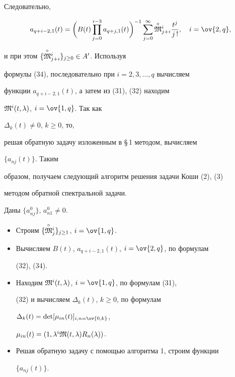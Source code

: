 Следовательно, 


\begin{equation} 


a_{q+i-2,1}(t)=\bigg(B(t)\prod^{i-3}_{j=0}a_{q+j,1}(t) 


\bigg)^{-1}\sum^\infty_{j=0}\up{\circ}{\frak M}^i_{j+i} 


\frac{t^j}{j\,!},\quad i=\ov{2,q}, 


\end{equation} 


и при этом $\{\overset{\circ}{\frak M}{}^i_{j+i}\}_{j\ge 0}\in A'$. Используя 


формулы (34), последовательно при $i=2,3,\dotsc,q$ вычисляем 


функции $a_{q+i-2,1}(t)$, а затем из (31), (32) находим 


$\frak M^i(t,\lambda)$, $i=\ov{1,q}$. Так как 


$\Delta_k(t)\ne 0$, $k\ge 0$, то, 


решая обратную задачу изложенным в \S\,1 методом, вычисляем 


$\{a_{nj}(t)\}$. Таким 


образом, получаем следующий алгоритм решения задачи Коши (2), (3) 


методом обратной спектральной задачи. 


 


\begin{alg} 


Даны $\{a^0_{nj}\}$, $a^0_{n1}\ne 0$. 


\begin{itemize} 


\item[1)] Строим $\{\overset{\circ}{\frak M}{}^i_j\}_{j\ge 1}$, $i=\ov{1,q}$. 


\item[2)] Вычисляем $B(t)$, $a_{q+i-2,1}(t)$, $i=\ov{2,q}$, по формулам 


(32), (34). 


\item[3)] Находим $\frak M^i(t,\lambda)$, $i=\ov{1,q}$, по формулам (31), 


(32) и вычисляем $\Delta_k(t)$, $k\ge 0$, по формулам 


$\Delta_k(t)=\det[\mu_{in}(t)]_{i,n=\ov{0,k}}$, 


$\mu_{in}(t)=(1,\lambda^i\frak M(t,\lambda)R_n(\lambda))$. 


\item[4)] Решая обратную задачу с помощью алгоритма 1, строим функции 


$\{a_{nj}(t)\}$. 


\end{itemize} 


\end{alg} 


